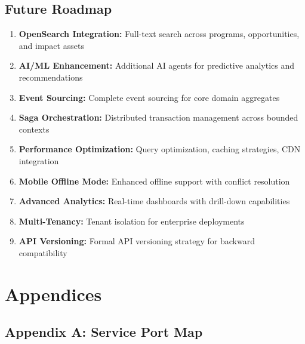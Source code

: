 \documentclass[11pt,a4paper]{article}
\begin{document}
\subsection{Future Roadmap}

\begin{enumerate}
  \item \textbf{OpenSearch Integration:} Full-text search across programs, opportunities, and impact assets
  \item \textbf{AI/ML Enhancement:} Additional AI agents for predictive analytics and recommendations
  \item \textbf{Event Sourcing:} Complete event sourcing for core domain aggregates
  \item \textbf{Saga Orchestration:} Distributed transaction management across bounded contexts
  \item \textbf{Performance Optimization:} Query optimization, caching strategies, CDN integration
  \item \textbf{Mobile Offline Mode:} Enhanced offline support with conflict resolution
  \item \textbf{Advanced Analytics:} Real-time dashboards with drill-down capabilities
  \item \textbf{Multi-Tenancy:} Tenant isolation for enterprise deployments
  \item \textbf{API Versioning:} Formal API versioning strategy for backward compatibility
\end{enumerate}

\clearpage

\section{Appendices}

\subsection{Appendix A: Service Port Map}
\end{document}
